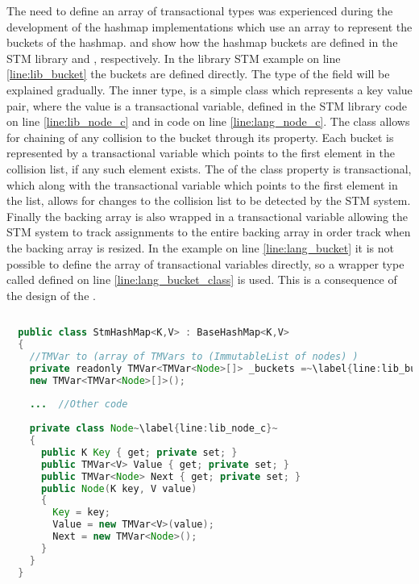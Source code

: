 The need to define an array of transactional types was experienced during the development of the hashmap implementations which use an array to represent the buckets of the hashmap.  and  show how the hashmap buckets are defined in the \ac{STM} library and \stmname, respectively. In the library \ac{STM} example on line \ref{line:lib_bucket} the buckets are defined directly. The type of the  field will be explained gradually. The inner  type, is a simple class which represents a key value pair, where the value is a transactional variable, defined in the \ac{STM} library code on line \ref{line:lib_node_c} and in \stmname code on line \ref{line:lang_node_c}. The  class allows for chaining of any collision to the bucket through its  property. Each bucket is represented by a transactional variable which points to the first element in the collision list, if any such element exists. The  of the  class property is transactional, which along with the transactional variable which points to the first element in the list, allows for changes to the collision list to be detected by the \ac{STM} system. Finally the backing array is also wrapped in a transactional variable allowing the \ac{STM} system to track assignments to the entire backing array in order track when the backing array is resized. In the \stmname example on line \ref{line:lang_bucket} it is not possible to define the array of transactional variables directly, so a wrapper type called  defined on line \ref{line:lang_bucket_class} is used. This is a consequence of the design of the \stmname.

\begin{lstlisting}[float,label=lst:lib_Buckets,
  caption={HashMap Buckets Array - \ac{STM} Library},
  language=Java,  
  showspaces=false,
  showtabs=false,
  breaklines=true,
  showstringspaces=false,
  breakatwhitespace=true,
  escapechar=~,
  commentstyle=\color{greencomments},
  keywordstyle=\color{bluekeywords},
  stringstyle=\color{redstrings},
  morekeywords={atomic, retry, orelse, var, get, set, ref, out, readonly}]  % Start your code-block
  
  public class StmHashMap<K,V> : BaseHashMap<K,V>
  {
    //TMVar to (array of TMVars to (ImmutableList of nodes) )
    private readonly TMVar<TMVar<Node>[]> _buckets =~\label{line:lib_bucket}~
    new TMVar<TMVar<Node>[]>();
  
    ...  //Other code
  
    private class Node~\label{line:lib_node_c}~
    {
      public K Key { get; private set; }
      public TMVar<V> Value { get; private set; }
      public TMVar<Node> Next { get; private set; }
      public Node(K key, V value)
      {
        Key = key;
        Value = new TMVar<V>(value);
        Next = new TMVar<Node>();
      }
    }
  }
\end{lstlisting}

